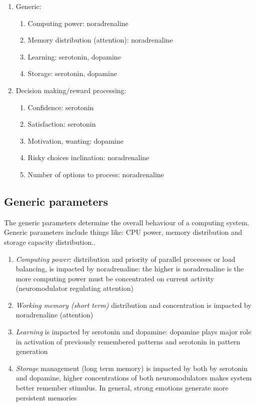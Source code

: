 \begin{enumerate}
 \item  Generic:
 \begin{enumerate}
  \item  Computing power: noradrenaline
  \item  Memory distribution (attention): noradrenaline
  \item  Learning: serotonin, dopamine
  \item  Storage: serotonin, dopamine
 \end{enumerate}
 \item  Decision making/reward processing:
 \begin{enumerate}
  \item  Confidence: serotonin
  \item  Satisfaction: serotonin
  \item  Motivation, wanting: dopamine
  \item  Risky choices inclination: noradrenaline
  \item  Number of options to process: noradrenaline
 \end{enumerate}
\end{enumerate}

\subsection{Generic parameters}

The generic parameters determine the overall behaviour of a computing system. Generic parameters include things like: CPU power, memory distribution and storage capacity distribution..

\begin{enumerate}
 \item  \emph{Computing power}: distribution and priority of parallel processes or load balancing, is impacted by noradrenaline: the higher is noradrenaline is the more computing power must be concentrated on current activity (neuromodulator regulating attention)
 \item  \emph{Working memory (short term)} distribution and concentration is impacted by noradrenaline (attention)
 \item  \emph{Learning} is impacted by serotonin and dopamine: dopamine plays major role in activation of previously remembered patterns and serotonin in pattern generation
 \item  \emph{Storage} management (long term memory) is impacted by both by serotonin and dopamine, higher concentrations of both neuromodulators makes system better remember stimulus. In general, strong emotions generate more persistent memories
\end{enumerate}

